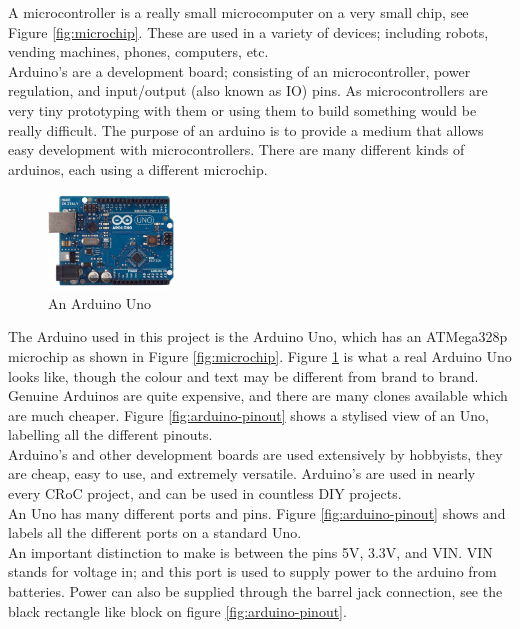 \documentclass[a4paper,12pt]{article}
\begin{document}
A microcontroller is a really small microcomputer on a very small chip, see Figure \ref{fig:microchip}.
These are used in a variety of devices; including robots, vending machines, phones, computers, etc. \\

Arduino's are a development board; consisting of an microcontroller, power regulation, and input/output (also known as IO) pins. As microcontrollers are very tiny prototyping with them or using them to build something would be really difficult. The purpose of an arduino is to provide a medium that allows easy development with microcontrollers. There are many different kinds of arduinos, each using a different microchip. \\

\begin{figure}
    \centering
    \vspace{-0.5cm}
    \includegraphics[width=0.3\textwidth]{arduino-uno.jpg}
    \caption{An Arduino Uno}
    \label{fig:arduino-real}
\end{figure}


The Arduino used in this project is the Arduino Uno, which has an ATMega328p microchip as shown in Figure \ref{fig:microchip}. Figure \ref{fig:arduino-real} is what a real Arduino Uno looks like, though the colour and text may be different from brand to brand. Genuine Arduinos are quite expensive, and there are many clones available which are much cheaper. Figure \ref{fig:arduino-pinout} shows a stylised view of an Uno, labelling all the different pinouts. \\

Arduino's and other development boards are used extensively by hobbyists, they are cheap, easy to use, and extremely versatile. Arduino's are used in nearly every CRoC project, and can be used in countless DIY projects. \\


An Uno has many different ports and pins. Figure \ref{fig:arduino-pinout} shows and labels all the different ports on a standard Uno. \\

An important distinction to make is between the pins 5V, 3.3V, and VIN. VIN stands for voltage in; and this port is used to supply power to the arduino from batteries. Power can also be supplied through the barrel jack connection, see the black rectangle like block on figure \ref{fig:arduino-pinout}. 
\end{document}
